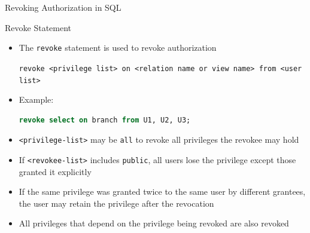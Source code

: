 \documentclass[aspectratio=169, xcolor=dvipsnames]{beamer}
\begin{document}
\begin{frame}[fragile]{Revoking Authorization in SQL}
    \begin{block}{Revoke Statement}
        \begin{itemize}[<+->]
            \item The \texttt{revoke} statement is used to revoke authorization
            \begin{center}
            \texttt{revoke <privilege list> on <relation name or view name> from <user list>}
            \end{center}
            \item Example:
            \begin{lstlisting}[language=SQL]
revoke select on branch from U1, U2, U3;
            \end{lstlisting}
            \item \texttt{<privilege-list>} may be \texttt{all} to revoke all privileges the revokee may hold
            \item If \texttt{<revokee-list>} includes \texttt{public}, all users lose the privilege except those granted it explicitly
            \item If the same privilege was granted twice to the same user by different grantees, the user may retain the privilege after the revocation
            \item All privileges that depend on the privilege being revoked are also revoked
        \end{itemize}
    \end{block}
\end{frame}
\end{document}

